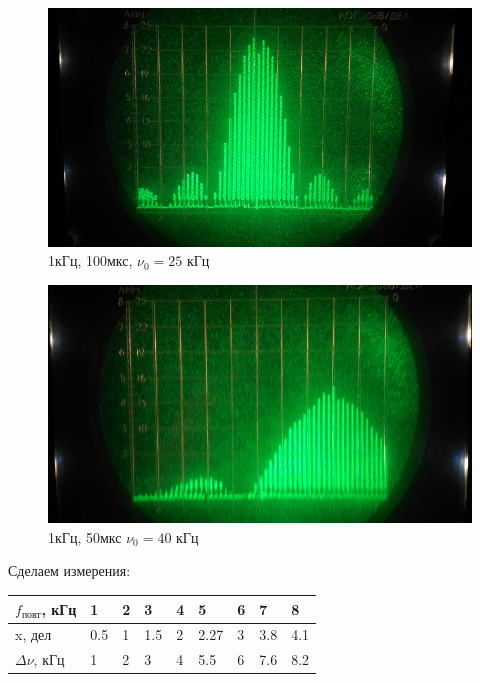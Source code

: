 \documentclass[a4paper,12pt]{article}
\begin{document}
		\begin{figure}[h!]
			\begin{minipage}[h]{0.49\linewidth}
				\centering
				\includegraphics[width=0.9\linewidth]{pic8} \\ 1кГц, 100мкс, $\nu_0 = 25$ кГц
			\end{minipage}
			\hfill
			\begin{minipage}[h]{0.49\linewidth}
				\centering
				\includegraphics[width=0.9\linewidth]{pic9} \\ 1кГц, 50мкс $\nu_0 = 40$ кГц
			\end{minipage}
		\end{figure}
		
		\newpage
		Сделаем измерения:
		
		\begin{table}[h!]
			\begin{tabular}{|l|l|l|l|l|l|l|l|l|}
				\hline
				$f_\text{повт}$, кГц           & 1   & 2 & 3   & 4 & 5    & 6 & 7   & 8   \\ \hline
				x, дел           & 0.5 & 1 & 1.5 & 2 & 2.27 & 3 & 3.8 & 4.1 \\ \hline
				$\Delta\nu$, кГц  & 1   & 2 & 3   & 4 & 5.5  & 6 & 7.6 & 8.2 \\ \hline
			\end{tabular}
			
			
		\end{table}
		
\end{document}
